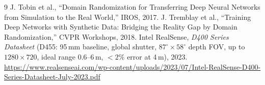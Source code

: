 \documentclass[10pt]{article}
\begin{document}
\begin{thebibliography}{9}
\footnotesize
{} J. Tobin et al., ``Domain Randomization for Transferring Deep Neural Networks from Simulation to the Real World,'' IROS, 2017.
 J. Tremblay et al., ``Training Deep Networks with Synthetic Data: Bridging the Reality Gap by Domain Randomization,'' CVPR Workshops, 2018.
 Intel RealSense, \emph{D400 Series Datasheet} (D455: 95\,mm baseline, global shutter, $87^\circ\times58^\circ$ depth FOV, up to $1280\times720$, ideal range 0.6--6\,m, $<2\%$ error at 4\,m), 2023. \url{https://www.realsenseai.com/wp-content/uploads/2023/07/Intel-RealSense-D400-Series-Datasheet-July-2023.pdf}
\end{thebibliography}
\end{document}

